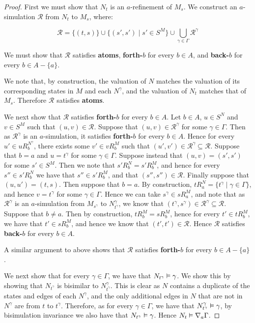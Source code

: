 \begin{proof}
First we must show that $N_t$ is an $a$-refinement of $M_s$. We construct an
$a$-simulation $\mathcal{R}$ from $N_t$ to $M_s$, where:

$$\mathcal{R} = \{(t, s)\} \cup \{(s', s') \mid s' \in S^M \} 
\cup \bigcup_{\gamma \in \Gamma} \mathcal{R}^\gamma$$

We must show that $\mathcal{R}$ satisfies {\bf atoms}, {\bf forth-$b$} for every
$b \in A$, and {\bf back-$b$} for every $b \in A - \{a\}$.

We note that, by construction, the valuation of $N$ matches the valuation of its
corresponding states in $M$ and each $N^\gamma$, and the valuation of $N_t$
matches that of $M_s$. Therefore $\mathcal{R}$ satisfies {\bf atoms}.

We next show that $\mathcal{R}$ satisfies {\bf forth-$b$} for every $b \in A$.
Let $b \in A$, $u \in S^N$ and $v \in S^M$ such that $(u, v) \in \mathcal{R}$.
Suppose that $(u, v) \in \mathcal{R}^\gamma$ for some $\gamma \in \Gamma$.
Then as $\mathcal{R}^\gamma$ is an $a$-simulation, it satisfies {\bf forth-$b$}
for every $b \in A$. Hence for every $u' \in uR^{N^\gamma}_b$, there exists some
$v' \in vR^M_b$ such that $(u', v') \in \mathcal{R}^\gamma \subseteq
\mathcal{R}$. Suppose that $b = a$ and $u = t^\gamma$ for some $\gamma \in
\Gamma$.  Suppose instead that $(u, v) = (s', s')$ for some $s' \in S^M$.  Then
we note that $s'R^N_b = s'R^M_b$, and hence for every $s'' \in s'R^N_b$ we have
that $s'' \in s'R^M_b$, and that $(s'', s'') \in \mathcal{R}$. Finally suppose
that $(u, u') = (t, s)$. Then suppose that $b = a$. By construction, $tR^N_a =
\{t^\gamma \mid \gamma \in \Gamma\}$, and hence $v = t^\gamma$ for some $\gamma
\in \Gamma$. Hence we can take $s^\gamma \in sR^M_a$, and note that as
$\mathcal{R}^\gamma$ is an $a$-simulation from $M_{s^\gamma}$ to
$N^\gamma_{t^\gamma}$, we know that $(t^\gamma, s^\gamma) \in \mathcal{R}^\gamma
\subseteq \mathcal{R}$. Suppose that $b \neq a$. Then by construction, $tR^M_b =
sR^M_b$, hence for every $t' \in tR^M_b$, we have that $t' \in sR^M_b$, and
hence we know that $(t', t') \in \mathcal{R}$. Hence $\mathcal{R}$ satisfies
{\bf back-$b$} for every $b \in A$.

A similar argument to above shows that $\mathcal{R}$ satisfies {\bf forth-$b$}
for every $b \in A - \{a\}$.

We next show that for every $\gamma \in \Gamma$, we have that $N_{t^\gamma}
\vDash \gamma$. We show this by showing that $N_{t^\gamma}$ is bisimilar to
$N^\gamma_{t^\gamma}$. This is clear as $N$ contains a duplicate of the states
and edges of each $N^\gamma$, and the only additional edges in $N$ that are not in
$N^\gamma$ are from $t$ to $t^\gamma$. Therefore, as for every $\gamma \in
\Gamma$, we have that $N^\gamma_{t^\gamma} \vDash \gamma$, by bisimulation
invariance we also have that $N_{t^\gamma} \vDash \gamma$. Hence $N_t \vDash
\nabla_a \Gamma$.


\end{proof}
